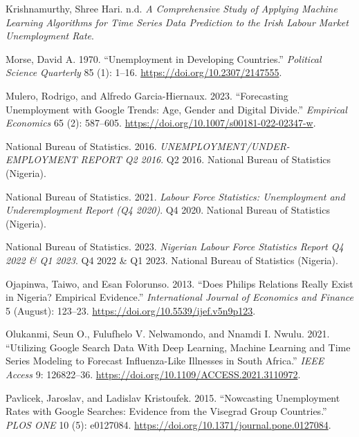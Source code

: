 \documentclass[
  letterpaper,
  DIV=11,
  numbers=noendperiod]{scrartcl}
\newlength{\cslhangindent}
\newenvironment{CSLReferences}[2] %
 {\begin{list}{}{%
  \setlength{\itemindent}{0pt}
  \setlength{\leftmargin}{0pt}
  \setlength{\parsep}{0pt}
  \ifodd #1
   \setlength{\leftmargin}{\cslhangindent}
   \setlength{\itemindent}{-1\cslhangindent}
  \fi
  \setlength{\itemsep}{#2\baselineskip}}}
 {\end{list}}
\begin{document}
\begin{CSLReferences}{1}{1}
Krishnamurthy, Shree Hari. n.d. \emph{A {Comprehensive} Study of
Applying Machine Learning Algorithms for Time Series Data Prediction to
the {Irish Labour Market Unemployment Rate}}.

Morse, David A. 1970. {``Unemployment in {Developing Countries}.''}
\emph{Political Science Quarterly} 85 (1): 1--16.
\url{https://doi.org/10.2307/2147555}.

Mulero, Rodrigo, and Alfredo Garcia-Hiernaux. 2023. {``Forecasting
Unemployment with {Google Trends}: Age, Gender and Digital Divide.''}
\emph{Empirical Economics} 65 (2): 587--605.
\url{https://doi.org/10.1007/s00181-022-02347-w}.

National Bureau of Statistics. 2016.
\emph{{UNEMPLOYMENT}/{UNDER}-{EMPLOYMENT REPORT Q2} 2016}. Q2 2016.
National Bureau of Statistics (Nigeria).

National Bureau of Statistics. 2021. \emph{Labour {Force Statistics}:
{Unemployment} and {Underemployment Report} ({Q4} 2020)}. Q4 2020.
National Bureau of Statistics (Nigeria).

National Bureau of Statistics. 2023. \emph{Nigerian {Labour Force
Statistics Report Q4} 2022 \& {Q1} 2023}. Q4 2022 \& Q1 2023. National
Bureau of Statistics (Nigeria).

Ojapinwa, Taiwo, and Esan Folorunso. 2013. {``Does {Philips Relations
Really Exist} in {Nigeria}? {Empirical Evidence}.''} \emph{International
Journal of Economics and Finance} 5 (August): 123--23.
\url{https://doi.org/10.5539/ijef.v5n9p123}.

Olukanmi, Seun O., Fulufhelo V. Nelwamondo, and Nnamdi I. Nwulu. 2021.
{``Utilizing {Google Search Data With Deep Learning}, {Machine Learning}
and {Time Series Modeling} to {Forecast Influenza-Like Illnesses} in
{South Africa}.''} \emph{IEEE Access} 9: 126822--36.
\url{https://doi.org/10.1109/ACCESS.2021.3110972}.

Pavlicek, Jaroslav, and Ladislav Kristoufek. 2015. {``Nowcasting
{Unemployment Rates} with {Google Searches}: {Evidence} from the
{Visegrad Group Countries}.''} \emph{PLOS ONE} 10 (5): e0127084.
\url{https://doi.org/10.1371/journal.pone.0127084}.


\end{CSLReferences}
\end{document}
